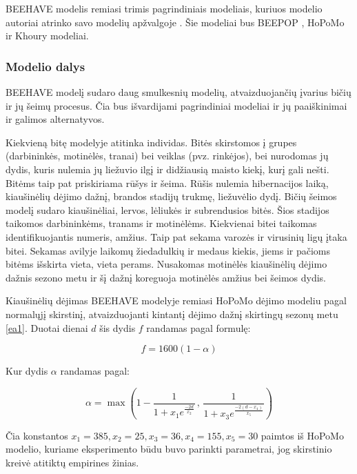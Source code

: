 \documentclass{VUMIFPSmagistrinis}
\begin{document}
BEEHAVE modelis remiasi trimis pagrindiniais modeliais, kuriuos modelio autoriai atrinko savo modelių apžvalgoje \cite{BTO13}. Šie modeliai bus BEEPOP \cite{DRL89} , HoPoMo \cite{ScC07} ir Khoury \cite{KBM13} modeliai. 

\subsubsection{Modelio dalys}

BEEHAVE modelį sudaro daug smulkesnių modelių, atvaizduojančių įvarius bičių ir jų šeimų procesus. Čia bus išvardijami pagrindiniai modeliai ir jų paaiškinimai ir galimos alternatyvos.


Kiekvieną bitę modelyje atitinka individas. Bitės skirstomos į grupes (darbininkės, motinėlės, tranai) bei veiklas (pvz. rinkėjos), bei nurodomas jų dydis, kuris nulemia jų liežuvio ilgį ir didžiausią maisto kiekį, kurį gali nešti. Bitėms taip pat priskiriama rūšys ir šeima. Rūšis nulemia hibernacijos laiką, kiaušinėlių dėjimo dažnį, brandos stadijų trukmę, liežuvėlio dydį.
Bičių šeimos modelį sudaro kiaušinėliai, lervos, lėliukės ir subrendusios bitės. Šios stadijos taikomos darbininkėms, tranams ir motinėlėms. Kiekvienai bitei taikomas identifikuojantis numeris, amžius. Taip pat sekama varozės ir virusinių ligų įtaka bitei. Sekamas avilyje laikomų žiedadulkių ir medaus kiekis, jiems ir pačioms bitėms išskirta vieta, vieta perams. Nusakomas motinėlės kiaušinėlių dėjimo dažnis sezono metu ir šį dažnį koreguoja motinėlės amžius bei šeimos dydis. 

Kiaušinėlių dėjimas BEEHAVE modelyje remiasi HoPoMo dėjimo modeliu pagal normalųjį skirstinį, atvaizduojanti kintantį dėjimo dažnį skirtingų sezonų metu \eqref{ea1}. Duotai dienai $d$ šis dydis $f$ randamas pagal formulę:


\begin{equation}\label{ef1}
f=1600(1-\alpha)
\end{equation}

Kur dydis $\alpha$ randamas pagal:

\begin{equation}\label{ea1}
\alpha= \max(1-\frac{1}{1+x_1e^\frac{-2d}{x_2}}\,,\,\frac{1}{1+x_3e^\frac{-2(d-x_4)}{x_5}})
\end{equation}


Čia konstantos $x_1=385, x_2=25, x_3=36, x_4=155, x_5=30$ paimtos iš HoPoMo modelio, kuriame eksperimento būdu buvo parinkti parametrai, jog skirstinio kreivė atitiktų empirines žinias.
\end{document}
